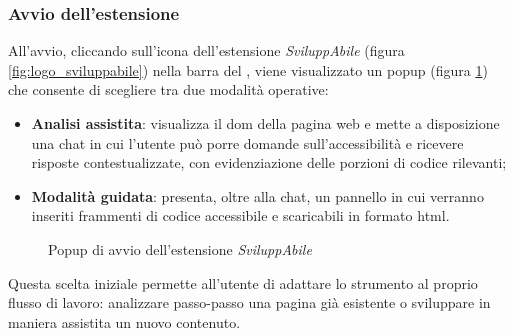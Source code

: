 \subsubsection{Avvio dell'estensione}
\noindent All’avvio, cliccando sull’icona dell’estensione \textit{SviluppAbile} (figura \ref{fig:logo_sviluppabile}) nella barra del , viene visualizzato un popup (figura \ref{fig:popup}) che consente di scegliere tra due modalità operative:
\begin{itemize}
  \item \textbf{Analisi assistita}: visualizza il \acrshort{dom} della pagina web e mette a disposizione una chat in cui l’utente può porre domande sull’accessibilità e ricevere risposte contestualizzate, con evidenziazione delle porzioni di codice rilevanti; 
  \item \textbf{Modalità guidata}: presenta, oltre alla chat, un pannello in cui verranno inseriti frammenti di codice accessibile e scaricabili in formato \acrshort{html}.
\end{itemize}

\begin{figure}[H]
    \centering
    \caption{Popup di avvio dell'estensione \textit{SviluppAbile}}\label{fig:popup}
\end{figure}

\noindent Questa scelta iniziale permette all’utente di adattare lo strumento al proprio flusso di lavoro: analizzare passo-passo una pagina già esistente o sviluppare in maniera assistita un nuovo contenuto.

